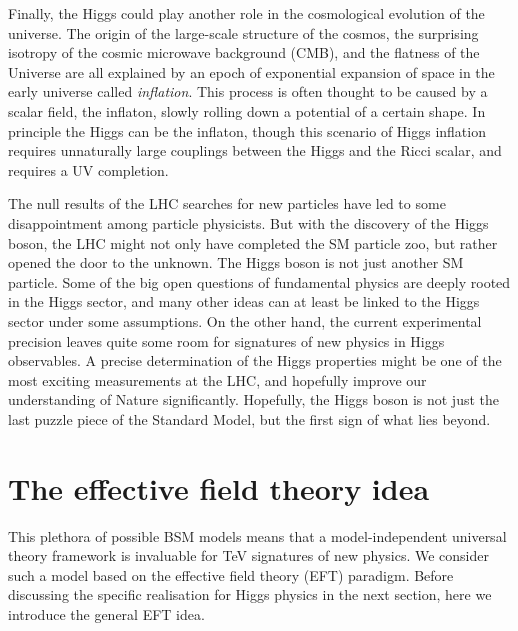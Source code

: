Finally, the Higgs could play another role in the cosmological
evolution of the universe. The origin of the large-scale structure of
the cosmos, the surprising isotropy of the cosmic microwave background
(CMB), and the flatness of the Universe are all explained by an epoch
of exponential expansion of space in the early universe called
\emph{inflation}. This process is often thought to be caused by a
scalar field, the inflaton, slowly rolling down a potential of a
certain shape. In principle the Higgs can be the inflaton, though this
scenario of Higgs inflation requires unnaturally large couplings
between the Higgs and the Ricci scalar, and requires a UV completion.

\newparagraph
%
The null results of the LHC searches for new particles have led to
some disappointment among particle physicists. But with the discovery
of the Higgs boson, the LHC might not only have completed the SM
particle zoo, but rather opened the door to the unknown.  The Higgs
boson is not just another SM particle.  Some of the big open questions
of fundamental physics are deeply rooted in the Higgs sector, and many
other ideas can at least be linked to the Higgs sector under some
assumptions. On the other hand, the current experimental precision
leaves quite some room for signatures of new physics in Higgs
observables. A precise determination of the Higgs properties might be
one of the most exciting measurements at the LHC, and hopefully
improve our understanding of Nature significantly. Hopefully, the
Higgs boson is not just the last puzzle piece of the Standard Model,
but the first sign of what lies beyond.



\section{The effective field theory idea}
\label{sec:foundations_eft}


This plethora of possible BSM models means that a model-independent
universal theory framework is invaluable for TeV signatures of new
physics. We consider such a model based on the effective field
theory (EFT) paradigm. Before discussing the specific realisation for
Higgs physics in the next section, here we introduce the general EFT idea.

